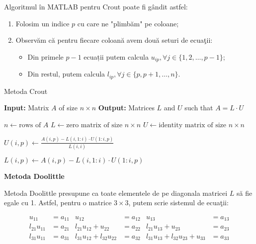 \documentclass{exam}
\newcommand{\octavescript}[2]{
	
}
\begin{document}
\par Algoritmul în MATLAB pentru Crout poate fi gândit astfel:

\begin{enumerate}
	\item Folosim un indice $p$ cu care ne "plimbăm" pe coloane;
	\item Observăm că pentru fiecare coloană avem două seturi de ecuaţii:
	      \begin{itemize}
		      \item Din primele $p - 1$ ecuații putem calcula $u_{ip}, \forall j \in \{1, 2, \ldots, p - 1\}$;
		      \item Din restul, putem calcula $l_{ip}, \forall j \in \{p, p + 1, \ldots, n\}$.
	      \end{itemize}
\end{enumerate}

\newpage

\begin{algorithm}
	\caption{Metoda Crout}
	\begin{algorithmic}[1]
		\State \textbf{Input:} Matrix \( A \) of size \( n \times n \)
		\State \textbf{Output:} Matrices \( L \) and \( U \) such that \( A = L \cdot U \)

		\State \( n \gets \text{rows of } A \)
		\State \( L \gets \text{zero matrix of size } n \times n \)
		\State \( U \gets \text{identity matrix of size } n \times n \)

		\State \( U(i, p) \gets \frac{A(i, p) - L(i, 1:i) \cdot U(1:i, p)}{L(i, i)} \)
		\EndFor

		\State \( L(i, p) \gets A(i, p) - L(i, 1:i) \cdot U(1:i, p) \)
		\EndFor
		\EndFor
	\end{algorithmic}
\end{algorithm}

\textbf{Metoda Doolittle}

\par Metoda Doolittle presupune ca toate elementele de pe diagonala matricei $L$
să fie egale cu 1. Astfel, pentru o matrice $3 \times 3$, putem scrie sistemul
de ecuaţii:

\begin{align*}
	u_{11}       & = a_{11} & u_{12}                      & = a_{12} & u_{13}                               & = a_{13} \\
	l_{21}u_{11} & = a_{21} & l_{21}u_{12} + u_{22}       & = a_{22} & l_{21}u_{13} + u_{23}                & = a_{23} \\
	l_{31}u_{11} & = a_{31} & l_{31}u_{12} + l_{32}u_{22} & = a_{32} & l_{31}u_{13} + l_{32}u_{23} + u_{33} & = a_{33}
\end{align*}
\end{document}
